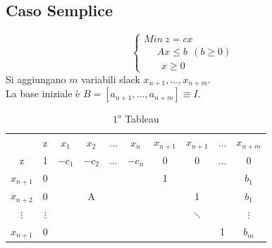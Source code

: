 \subsection{Caso Semplice}
\begin{equation*}
	\begin{cases}
		Min\ z=cx \\
		\ \ \ \ \ \ Ax\le b\ \ (b\ge 0) \\
		\ \ \ \ \ \ \ \ x\ge 0
	\end{cases}
\end{equation*}
Si aggiungano $m$ variabili slack $x_{n+1},\dots,x_{n+m}$.\\
La base iniziale è $B=[a_{n+1},\dots,a_{n+m}]\equiv I$.
\begin{table}[h]
	\centering
	\caption{$1^{o}$ Tableau}
	\begin{tabular}{c|c|cccc|cccc|}
		& z & $x_{1}$ & $x_{2}$ & $\dots$ & $x_{n}$ & $x_{n+1}$ & $x_{n+1}$ & $\dots$ & $x_{n+m}$ \\ \cline{2-10}
		z & 1 & $-c_{1}$ & $-c_{2}$ & $\dots$ & $-c_{n}$ & 0 & 0 & $\dots$ & 0 \\ \cline{2-10}
		$x_{n+1}$ & 0 &  &  &  &  & 1 &  &  & $b_{1}$ \\
		$x_{n+2}$ & 0 &  & A &  &  &  & 1 &  & $b_{1}$ \\
		$\vdots$ & $\vdots$ &  &  &  &  &  & $\ddots$ & & $\vdots$ \\
		$x_{n+1}$ & 0 &  &  &  &  &  &  & 1 & $b_{m}$ \\ \cline{2-10}
	\end{tabular}
\end{table}


